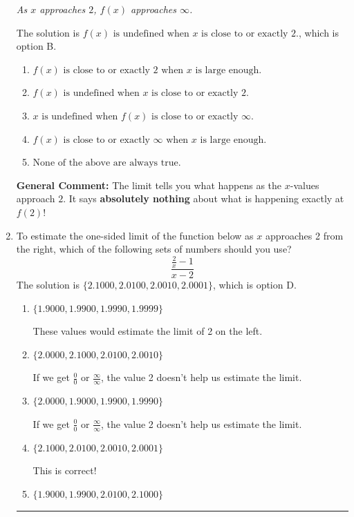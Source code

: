\documentclass{extbook}[14pt]
\newcommand{\litem}[1]{\item #1

\rule{\textwidth}{0.4pt}}
\begin{document}
\begin{enumerate}
{\begin{center}
    \textit{ As $x$ approaches $2$, $f(x)$ approaches $\infty$. }
\end{center}
The solution is \( f(x) \text{ is undefined when } x \text{ is close to or exactly } 2. \), which is option B.\begin{enumerate}[label=\Alph*.]
\item \( f(x) \text{ is close to or exactly } 2 \text{ when } x \text{ is large enough}. \)


\item \( f(x) \text{ is undefined when } x \text{ is close to or exactly } 2. \)


\item \( x \text{ is undefined when } f(x) \text{ is close to or exactly } \infty. \)


\item \( f(x) \text{ is close to or exactly } \infty \text{ when } x \text{ is large enough}. \)


\item \( \text{None of the above are always true.} \)


\end{enumerate}

\textbf{General Comment:} The limit tells you what happens as the $x$-values approach $2$. It says \textbf{absolutely nothing} about what is happening exactly at $f(2)$!
}
\litem{
To estimate the one-sided limit of the function below as $x$ approaches 2 from the right, which of the following sets of numbers should you use?
\[ \frac{\frac{2}{x} - 1}{x - 2} \]The solution is \( \{ 2.1000, 2.0100, 2.0010, 2.0001 \} \), which is option D.\begin{enumerate}[label=\Alph*.]
\item \( \{ 1.9000, 1.9900, 1.9990, 1.9999 \} \)

These values would estimate the limit of 2 on the left.
\item \( \{ 2.0000, 2.1000, 2.0100, 2.0010 \} \)

If we get $\frac{0}{0}$ or $\frac{\infty}{\infty}$, the value 2 doesn't help us estimate the limit.
\item \( \{ 2.0000, 1.9000, 1.9900, 1.9990 \} \)

If we get $\frac{0}{0}$ or $\frac{\infty}{\infty}$, the value 2 doesn't help us estimate the limit.
\item \( \{ 2.1000, 2.0100, 2.0010, 2.0001 \} \)

This is correct!
\item \( \{ 1.9000, 1.9900, 2.0100, 2.1000 \} \)


\end{enumerate}}
\end{enumerate}
\end{document}
